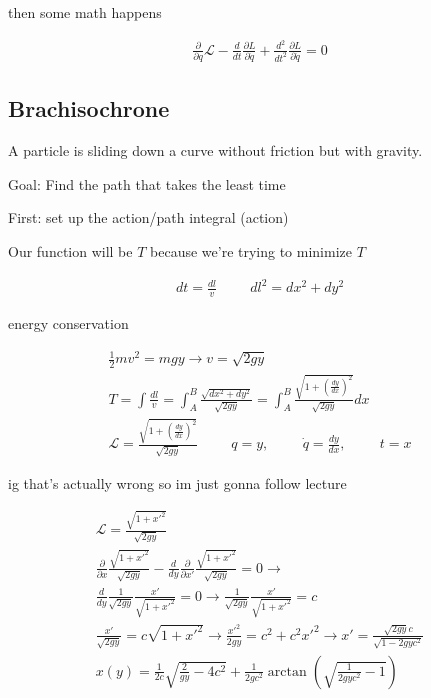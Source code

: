 \documentclass[fleqn]{report}
\newcommand{\hp}{\hspace{1cm}}
\newcommand{\del}{\partial}
\newcommand{\equations} [1] {
\begin{gather*}
#1
\end{gather*}
}
\begin{document}
then some math happens 
\equations{
    \frac{\del}{\del q} \mathcal L - \frac{d}{dt} \frac{\del L}{\del \dot q} + 
    \frac{d^2}{dt^2} \frac{\del L}{\del \ddot q} 
    = 0
}

\subsection{Brachisochrone}
A particle is sliding down a curve without friction but with gravity. 

Goal: Find the path that takes the least time 

First: set up the action/path integral (action)

Our function will be $T$ because we're trying to minimize $T$

\equations{
    dt = \frac{dl}{v} \hp dl^2 = dx^2 + dy^2
}
energy conservation 
\equations{
    \frac{1}{2} mv^2 = mgy \rightarrow 
    v = \sqrt{2gy}
    \\
    T
    =
    \int \frac{dl}{v} = 
    \int^B_A \frac{\sqrt{dx^2 + dy^2}}{\sqrt{2gy}}
    =
    \int^B_A \frac{\sqrt{1 + (\frac{dy}{dx})^2}}{\sqrt{2gy}} dx
    \\
    \mathcal L = \frac{\sqrt{1 + (\frac{dy}{dx})^2}}{\sqrt{2gy}}
    \hp 
    q = y, \hp \dot q = \frac{dy}{dx}, \hp t = x
}
ig that's actually wrong so im just gonna follow lecture 

\equations{
    \mathcal L =  
    \frac{\sqrt{1 + x'^2}}{\sqrt{2gy}}
    \\
    \frac{\del}{\del x}
    \frac{\sqrt{1 + x'^2}}{\sqrt{2gy}}
    -
    \frac{d}{dy}
    \frac{\del}{\del x'}
    \frac{\sqrt{1 + x'^2}}{\sqrt{2gy}}
    = 0
    \rightarrow 
    \\
    \frac{d}{dy}
    \frac{1}{\sqrt{2gy}} \frac{x'}{\sqrt{1 + x'^2}}
    = 0
    \rightarrow
    \frac{1}{\sqrt{2gy}} \frac{x'}{\sqrt{1 + x'^2}}
    = c
    \\
    \frac{x'}{\sqrt{2gy}}
    = c\sqrt{1 + x'^2}
    \rightarrow
    \frac{x'^2}{2gy}
    = c^2 + c^2 x'^2
    \rightarrow 
    x' = \frac{\sqrt{2gy} c}{\sqrt{1 - 2gy c^2}}
    \\
    x(y) = \frac{1}{2c} \sqrt{\frac{2}{gy} - 4c^2}
    +
    \frac{1}{2gc^2} \arctan(\sqrt{\frac{1}{2gyc^2} - 1})
}
\end{document}
